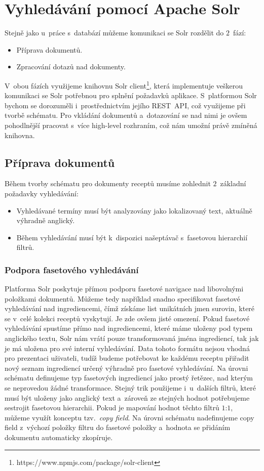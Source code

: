\section{Vyhledávání pomocí Apache Solr}

Stejně jako u~práce s~databází můžeme komunikaci se Solr rozdělit do $2$~fází:
\begin{itemize}
    \item Příprava dokumentů.
    \item Zpracování dotazů nad dokumenty.
\end{itemize}

V~obou fázích využijeme knihovnu Solr client\footnote{https://www.npmjs.com/package/solr-client}, která implementuje veškerou komunikaci se Solr potřebnou pro splnění požadavků aplikace. S~platformou Solr bychom se dorozuměli i~prostřednictvím jejího REST~API, což využijeme při tvorbě schématu. Pro vkládání dokumentů a~dotazování se nad nimi je ovšem pohodlnější pracovat s~více high-level rozhraním, což nám umožní právě zmíněná knihovna.

\subsection{Příprava dokumentů}

Během tvorby schématu pro dokumenty receptů musíme zohlednit $2$~základní požadavky vyhledávání:
\begin{itemize}
    \item Vyhledávané termíny musí být analyzovány jako lokalizovaný text, aktuálně výhradně anglický.
    \item Během vyhledávání musí být k~dispozici našeptávač s~fasetovou hierarchií filtrů.
\end{itemize}

\subsubsection{Podpora fasetového vyhledávání}

Platforma Solr poskytuje přímou podporu fasetové navigace nad libovolnými položkami dokumentů. Můžeme tedy například snadno specifikovat fasetové vyhledávání nad ingrediencemi, čímž získáme list unikátních jmen surovin, které se v~celé kolekci receptů vyskytují. Je zde ovšem jisté omezení. Pokud fasetové vyhledávání spustíme přímo nad ingrediencemi, které máme uloženy pod typem anglického textu, Solr nám vrátí pouze transformovaná jména ingrediencí, tak jak je má uložena pro své interní vyhledávání. Data tohoto formátu nejsou vhodná pro prezentaci uživateli, tudíž budeme potřebovat ke každému receptu přiřadit nový seznam ingrediencí určený výhradně pro fasetové vyhledávání. Na úrovni schématu definujeme typ fasetových ingrediencí jako prostý řetězec, nad kterým se neprovedou žádné transformace. Stejný trik použijeme i~u~dalších filtrů, které musí být uloženy jako anglický text a~zároveň ze stejných hodnot potřebujeme sestrojit fasetovou hierarchii. Pokud je mapování hodnot těchto filtrů $1$:$1$, můžeme využít konceptu tzv.~\emph{copy field}. Na úrovni schématu nadefinujeme copy field z~výchozí položky filtru do fasetové položky a~hodnota se přidáním dokumentu automaticky zkopíruje.

